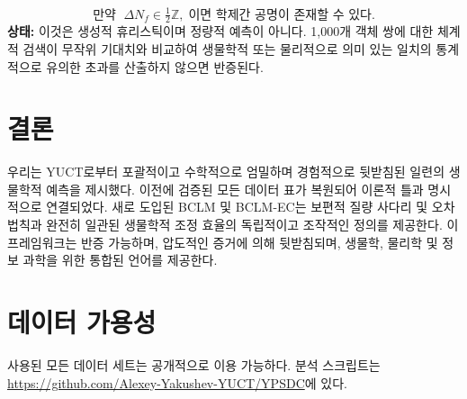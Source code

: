 \documentclass[11pt,a4paper]{article}
\begin{document}
	\begin{equation}\label{eq:pred-hg}
		\text{만약 }\; \Delta N_f \in \tfrac12\mathbb{Z},\;
		\text{이면 학제간 공명이 존재할 수 있다.}
	\end{equation}
	\textbf{상태:} 이것은 생성적 휴리스틱이며 정량적 예측이 아니다. 1,000개 객체 쌍에 대한 체계적 검색이 무작위 기대치와 비교하여 생물학적 또는 물리적으로 의미 있는 일치의 통계적으로 유의한 초과를 산출하지 않으면 반증된다.
	
	\section{결론}
	
	우리는 YUCT로부터 포괄적이고 수학적으로 엄밀하며 경험적으로 뒷받침된 일련의 생물학적 예측을 제시했다. 이전에 검증된 모든 데이터 표가 복원되어 이론적 틀과 명시적으로 연결되었다. 새로 도입된 BCLM 및 BCLM-EC는 보편적 질량 사다리 및 오차 법칙과 완전히 일관된 생물학적 조정 효율의 독립적이고 조작적인 정의를 제공한다. 이 프레임워크는 반증 가능하며, 압도적인 증거에 의해 뒷받침되며, 생물학, 물리학 및 정보 과학을 위한 통합된 언어를 제공한다.
	
	\section*{데이터 가용성}
	
	사용된 모든 데이터 세트는 공개적으로 이용 가능하다. 분석 스크립트는 \url{https://github.com/Alexey-Yakushev-YUCT/YPSDC}에 있다.
	
\end{document}

